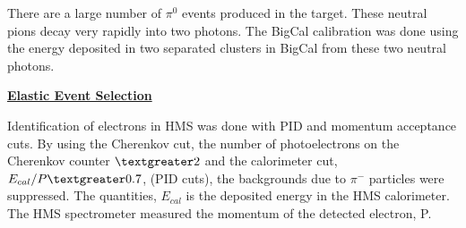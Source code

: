 \documentclass[12pt]{article}
\begin{document}

There are a large number of $\pi^0$ events produced in the target. These neutral pions decay very rapidly into two photons. The BigCal calibration was done using the energy deposited in two separated clusters in BigCal from these two neutral photons.

{
\raggedleft
\underline{\textbf{Elastic Event Selection}}
}

Identification of electrons in HMS was done with PID and momentum acceptance cuts. By using the Cherenkov cut, the number of photoelectrons on the Cherenkov counter $\textgreater 2$ and the calorimeter cut, $E_{cal}/P\textgreater0.7$, (PID cuts), the backgrounds due to $\pi^-$ particles were suppressed. The quantities, $E_{cal}$ is the deposited energy in the HMS calorimeter. The HMS spectrometer measured the momentum of the detected electron, P.
\end{document}
